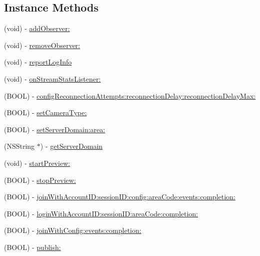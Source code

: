 \subsection*{Instance Methods}
\begin{DoxyCompactItemize}
\item 
(void) -\/ \hyperlink{interface_c_c_streamer_basic_ad25d3d5930be6f375133272c6ff30324}{add\+Observer\+:}
\item 
(void) -\/ \hyperlink{interface_c_c_streamer_basic_a3b6770a7d93808beee1672f04c9090cb}{remove\+Observer\+:}
\item 
(void) -\/ \hyperlink{interface_c_c_streamer_basic_ad2772456b583a89888dba4f3157482a9}{report\+Log\+Info}
\item 
(void) -\/ \hyperlink{interface_c_c_streamer_basic_a3df60b5ba3cc43eb471ec439e571be95}{on\+Stream\+Stats\+Listener\+:}
\item 
(B\+O\+OL) -\/ \hyperlink{interface_c_c_streamer_basic_a33e6149b5a9e325bf2f69fff6b1353d5}{config\+Reconnection\+Attempts\+:reconnection\+Delay\+:reconnection\+Delay\+Max\+:}
\item 
(B\+O\+OL) -\/ \hyperlink{interface_c_c_streamer_basic_a6f342af6416873ec1608a4f270cec09e}{set\+Camera\+Type\+:}
\item 
(B\+O\+OL) -\/ \hyperlink{interface_c_c_streamer_basic_ad9fbe9111472b624255976c998a7a16f}{set\+Server\+Domain\+:area\+:}
\item 
(N\+S\+String $\ast$) -\/ \hyperlink{interface_c_c_streamer_basic_a78dad7e95f697219990fb73486db9807}{get\+Server\+Domain}
\item 
(void) -\/ \hyperlink{interface_c_c_streamer_basic_a719419e4a1d870d984373391e67eec27}{start\+Preview\+:}
\item 
(B\+O\+OL) -\/ \hyperlink{interface_c_c_streamer_basic_a67d4c1109da3c868368a0af1dc66ddf5}{stop\+Preview\+:}
\item 
(B\+O\+OL) -\/ \hyperlink{interface_c_c_streamer_basic_a637f17e6b34cda147b5f737f89faa9b5}{join\+With\+Account\+I\+D\+:session\+I\+D\+:config\+:area\+Code\+:events\+:completion\+:}
\item 
(B\+O\+OL) -\/ \hyperlink{interface_c_c_streamer_basic_a56a0d95094f6c4b9faf2e6c526bf6222}{login\+With\+Account\+I\+D\+:session\+I\+D\+:area\+Code\+:completion\+:}
\item 
(B\+O\+OL) -\/ \hyperlink{interface_c_c_streamer_basic_af1d3dce7b83deb25b77dd079f0992f67}{join\+With\+Config\+:events\+:completion\+:}
\item 
(B\+O\+OL) -\/ \hyperlink{interface_c_c_streamer_basic_a2a7f9c89eb1279f7bde5f664e333e935}{publish\+:}

\end{DoxyCompactItemize}
